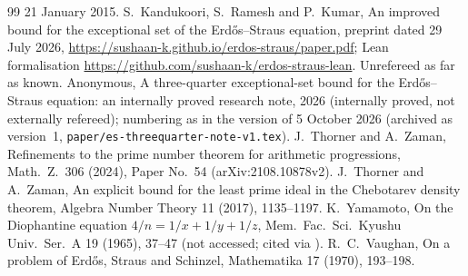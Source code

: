 \documentclass[11pt,reqno]{amsart}
\theoremstyle{definition}
\begin{document}
\begin{thebibliography}{99}
21 January 2015.
 S.~Kandukoori, S.~Ramesh and P.~Kumar, An improved bound for the
exceptional set of the Erd\H{o}s--Straus equation, preprint dated 29 July 2026,
\url{https://sushaan-k.github.io/erdos-straus/paper.pdf}; Lean formalisation
\url{https://github.com/sushaan-k/erdos-straus-lean}.  Unrefereed as far as known.
 Anonymous, A three-quarter exceptional-set bound for the
Erd\H{o}s--Straus equation: an internally proved research note, 2026
(internally proved, not externally refereed); numbering as in the version of
5 October 2026 (archived as version~1, \texttt{paper/es-threequarter-note-v1.tex}).
 J.~Thorner and A.~Zaman, Refinements to the prime number theorem
for arithmetic progressions, Math.\ Z.\ 306 (2024), Paper No.~54
(arXiv:2108.10878v2).
 J.~Thorner and A.~Zaman, An explicit bound for the least
prime ideal in the Chebotarev density theorem, Algebra Number Theory 11
(2017), 1135--1197.
 K.~Yamamoto, On the Diophantine equation
$4/n=1/x+1/y+1/z$, Mem.\ Fac.\ Sci.\ Kyushu Univ.\ Ser.\ A 19 (1965), 37--47
(not accessed; cited via \cite{ET}).
 R.~C.~Vaughan, On a problem of Erd\H{o}s, Straus and
Schinzel, Mathematika 17 (1970), 193--198.
\end{thebibliography}
\end{document}
